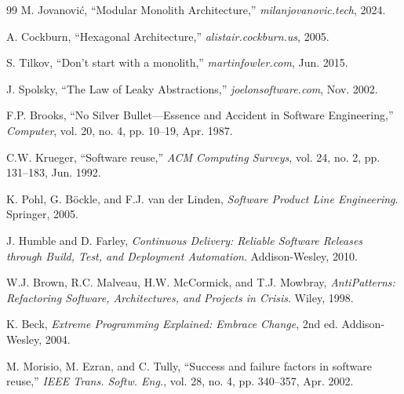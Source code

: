 \documentclass[conference]{IEEEtran}
\begin{document}
\begin{thebibliography}{99}
M. Jovanovi\'c, ``Modular Monolith Architecture,'' \textit{milanjovanovic.tech}, 2024.

A. Cockburn, ``Hexagonal Architecture,'' \textit{alistair.cockburn.us}, 2005.

S. Tilkov, ``Don't start with a monolith,'' \textit{martinfowler.com}, Jun. 2015.

J. Spolsky, ``The Law of Leaky Abstractions,'' \textit{joelonsoftware.com}, Nov. 2002.

F.P. Brooks, ``No Silver Bullet---Essence and Accident in Software Engineering,'' \textit{Computer}, vol. 20, no. 4, pp. 10--19, Apr. 1987.

C.W. Krueger, ``Software reuse,'' \textit{ACM Computing Surveys}, vol. 24, no. 2, pp. 131--183, Jun. 1992.

K. Pohl, G. B\"ockle, and F.J. van der Linden, \textit{Software Product Line Engineering}. Springer, 2005.

J. Humble and D. Farley, \textit{Continuous Delivery: Reliable Software Releases through Build, Test, and Deployment Automation}. Addison-Wesley, 2010.

W.J. Brown, R.C. Malveau, H.W. McCormick, and T.J. Mowbray, \textit{AntiPatterns: Refactoring Software, Architectures, and Projects in Crisis}. Wiley, 1998.

K. Beck, \textit{Extreme Programming Explained: Embrace Change}, 2nd ed. Addison-Wesley, 2004.

M. Morisio, M. Ezran, and C. Tully, ``Success and failure factors in software reuse,'' \textit{IEEE Trans. Softw. Eng.}, vol. 28, no. 4, pp. 340--357, Apr. 2002.

\end{thebibliography}
\end{document}
